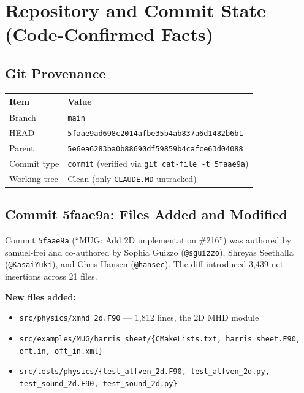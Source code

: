 \documentclass[11pt,letterpaper]{article}
\begin{document}
\section{Repository and Commit State (Code-Confirmed Facts)}

\subsection{Git Provenance}

\begin{center}
\begin{tabular}{ll}
\toprule
\textbf{Item} & \textbf{Value} \\
\midrule
Branch & \texttt{main} \\
HEAD & \texttt{5faae9ad698c2014afbe35b4ab837a6d1482b6b1} \\
Parent & \texttt{5e6ea6283ba0b88690df59859b4cafce63d04088} \\
Commit type & \texttt{commit} (verified via \texttt{git cat-file -t 5faae9a}) \\
Working tree & Clean (only \texttt{CLAUDE.MD} untracked) \\
\bottomrule
\end{tabular}
\end{center}

\subsection{Commit 5faae9a: Files Added and Modified}

Commit \texttt{5faae9a} (``MUG: Add 2D implementation \#216'') was authored by
samuel-frei and co-authored by Sophia Guizzo (\texttt{@sguizzo}), Shreyas
Seethalla (\texttt{@KasaiYuki}), and Chris Hansen (\texttt{@hansec}).  The
diff introduced 3{,}439 net insertions across 21 files.

\textbf{New files added:}
\begin{itemize}
  \item \texttt{src/physics/xmhd\_2d.F90} --- 1{,}812 lines, the 2D MHD module
  \item \texttt{src/examples/MUG/harris\_sheet/\{CMakeLists.txt, harris\_sheet.F90, oft.in, oft\_in.xml\}}
  \item \texttt{src/tests/physics/\{test\_alfven\_2d.F90, test\_alfven\_2d.py, test\_sound\_2d.F90, test\_sound\_2d.py\}}
\end{itemize}
\end{document}
